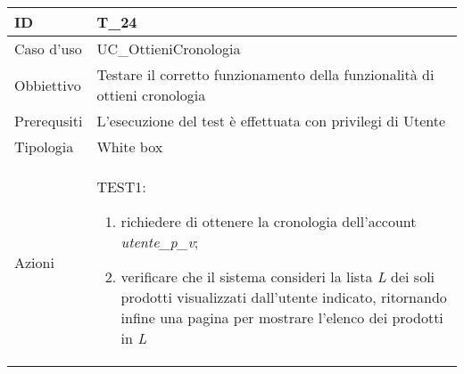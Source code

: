 \begin{table}[hb]
    \centering
    \begin{tabular}{ |p{2cm}|p{10cm}|  }
        \hline
        ID          & T\_24                                                                      \\\hline
        Caso d'uso  & UC\_OttieniCronologia                                                      \\\hline
        Obbiettivo  & Testare il corretto funzionamento della funzionalità di ottieni cronologia \\\hline
        Prerequsiti & L'esecuzione del test è effettuata con privilegi di Utente                 \\\hline
        Tipologia   & White box                                                                  \\\hline
        Azioni      &
        TEST1:
        \begin{enumerate}[nosep, topsep=0pt]
            \item richiedere di ottenere la cronologia dell'account \emph{utente\_p\_v};
            \item verificare che il sistema consideri la lista \emph{L} dei soli prodotti visualizzati dall'utente indicato, ritornando infine una pagina per mostrare l'elenco dei prodotti in \emph{L}
        \end{enumerate}
        \\\hline
    \end{tabular}
\end{table}


